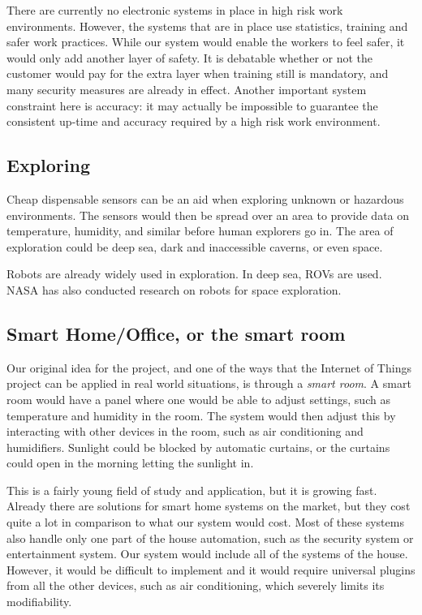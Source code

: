 \documentclass[../document.tex]{subfiles}
\begin{document}
There are currently no electronic systems in place in high risk work environments. However, the systems that are in place use statistics, training and safer work practices. While our system would enable the workers to feel safer, it would only add another layer of safety. It is debatable whether or not the customer would pay for the extra layer when training still is mandatory, and many security measures are already in effect. Another important system constraint here is accuracy: it may actually be impossible to guarantee the consistent up-time and accuracy required by a high risk work environment.

\subsection{Exploring}
Cheap dispensable sensors can be an aid when exploring unknown or hazardous environments. The sensors would then be spread over an area to provide data on temperature, humidity, and similar before human explorers go in. The area of exploration could be deep sea, dark and inaccessible caverns, or even space.

Robots are already widely used in exploration. In deep sea, ROVs are used. NASA has also conducted research on robots for space exploration.

\subsection{Smart Home/Office, or the smart room}
Our original idea for the project, and one of the ways that the Internet of Things project can be applied in real world situations, is through a \emph{smart room}. A smart room would have a panel where one would be able to adjust settings, such as temperature and humidity in the room. The system would then adjust this by interacting with other devices in the room, such as air conditioning and humidifiers. Sunlight could be blocked by automatic curtains, or the curtains could open in the morning letting the sunlight in.

This is a fairly young field of study and application, but it is growing fast. Already there are solutions for smart home systems on the market, but they cost quite a lot in comparison to what our system would cost. Most of these systems also handle only one part of the house automation, such as the security system or entertainment system. Our system would include all of the systems of the house. However, it would be difficult to implement and it would require universal plugins from all the other devices, such as air conditioning, which severely limits its modifiability.
\end{document}
